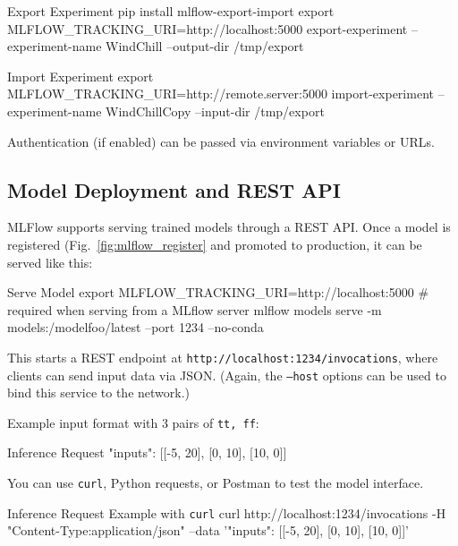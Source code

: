 \begin{codeonly}{Export Experiment}
pip install mlflow-export-import
export MLFLOW_TRACKING_URI=http://localhost:5000
export-experiment --experiment-name WindChill --output-dir /tmp/export
\end{codeonly}

\begin{codeonly}{Import Experiment}
export MLFLOW_TRACKING_URI=http://remote.server:5000
import-experiment --experiment-name WindChillCopy --input-dir /tmp/export
\end{codeonly}

Authentication (if enabled) can be passed via environment variables or URLs.


%
\subsection{Model Deployment and REST API}

MLFlow supports serving trained models through a REST API. Once a model is registered (Fig.~\ref{fig:mlflow_register} and promoted to production, it can be served like this:

\begin{codeonly}{Serve Model}
export MLFLOW_TRACKING_URI=http://localhost:5000 # required when serving from a MLflow server
mlflow models serve -m models:/modelfoo/latest --port 1234 --no-conda
\end{codeonly}

This starts a REST endpoint at \texttt{http://localhost:1234/invocations}, where clients can send input data via JSON. (Again, the \texttt{--host} options can be used to bind this service to the network.)

Example input format with 3 pairs of \texttt{tt, ff}:

\begin{codeonly}{Inference Request}
{
  "inputs": [[-5, 20], [0, 10], [10, 0]]
}
\end{codeonly}

You can use \texttt{curl}, Python requests, or Postman to test the model interface.

\begin{codeonly}{Inference Request Example with \texttt{curl}}
curl http://localhost:1234/invocations -H "Content-Type:application/json"  --data '{"inputs": [[-5, 20], [0, 10], [10, 0]]}'
\end{codeonly}

